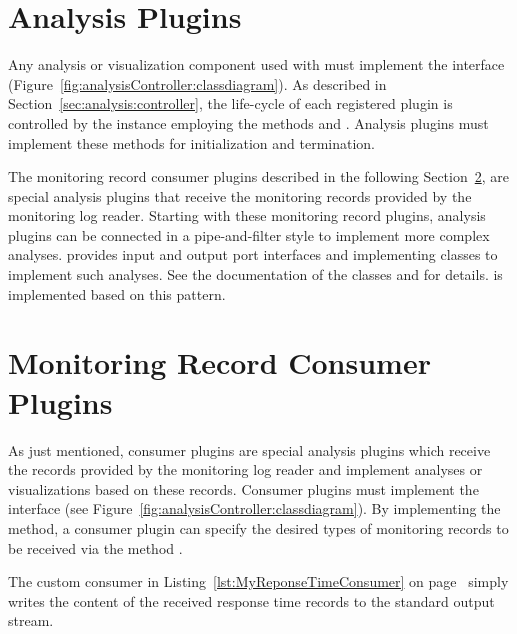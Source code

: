 
\setJavaCodeListing


\section{Analysis Plugins}\label{sec:analysis:plugins}

Any analysis or visualization component used with \KiekerAnalysisPart{} must %
implement the interface  (Figure~\ref{fig:analysisController:classdiagram}). %
As described in Section~\ref{sec:analysis:controller}, the life-cycle of each %
registered plugin is controlled by the  instance %
employing the methods  and . Analysis plugins %
must implement these methods for initialization and termination.

The monitoring record consumer plugins described in the following %
Section~\ref{sec:analysis:consumer}, are special analysis plugins that receive %
the monitoring records provided by the monitoring log reader. %
Starting with these monitoring record plugins, analysis plugins can be connected %
in a pipe-and-filter style to implement more complex analyses. %
\Kieker{} provides input and output port interfaces and implementing classes %
to implement such analyses. See the documentation of the classes  %
and  for details. \KiekerTraceAnalysis{} is implemented %
based on this pattern. 

\section{Monitoring Record Consumer Plugins}\label{sec:analysis:consumer}

As just mentioned, consumer plugins are special analysis plugins which receive %
the records provided by the monitoring log reader and implement analyses or %
visualizations based on these records. %
Consumer plugins must implement the interface  %
(see Figure~\ref{fig:analysisController:classdiagram}). %
By implementing the  method, a consumer plugin %
can specify the desired types of monitoring records to be received via the %
method .

The custom consumer in Listing~\ref{lst:MyReponseTimeConsumer} on %
page~\pageref{lst:MyReponseTimeConsumer} simply writes %
the content of the received response time records to the standard output stream.

\pagebreak

\setJavaCodeListing

